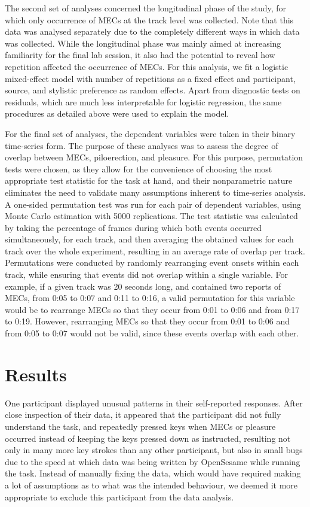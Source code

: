 The second set of analyses concerned the longitudinal phase of the study, for which only occurrence of MECs at the track level was collected. Note that this data was analysed separately due to the completely different ways in which data was collected. While the longitudinal phase was mainly aimed at increasing familiarity for the final lab session, it also had the potential to reveal how repetition affected the occurrence of MECs. For this analysis, we fit a logistic mixed-effect model with number of repetitions as a fixed effect and participant, source, and stylistic preference as random effects. Apart from diagnostic tests on residuals, which are much less interpretable for logistic regression, the same procedures as detailed above were used to explain the model.

For the final set of analyses, the dependent variables were taken in their binary time-series form. The purpose of these analyses was to assess the degree of overlap between MECs, piloerection, and pleasure. For this purpose, permutation tests were chosen, as they allow for the convenience of choosing the most appropriate test statistic for the task at hand, and their nonparametric nature eliminates the need to validate many assumptions inherent to time-series analysis. A one-sided permutation test was run for each pair of dependent variables, using Monte Carlo estimation with 5000 replications. The test statistic was calculated by taking the percentage of frames during which both events occurred simultaneously, for each track, and then averaging the obtained values for each track over the whole experiment, resulting in an average rate of overlap per track. Permutations were conducted by randomly rearranging event onsets within each track, while ensuring that events did not overlap within a single variable. For example, if a given track was 20 seconds long, and contained two reports of MECs, from 0:05 to 0:07 and 0:11 to 0:16, a valid permutation for this variable would be to rearrange MECs so that they occur from 0:01 to 0:06 and from 0:17 to 0:19. However, rearranging MECs so that they occur from 0:01 to 0:06 and from 0:05 to 0:07 would not be valid, since these events overlap with each other.

\section{Results}

One participant displayed unusual patterns in their self-reported responses. After close inspection of their data, it appeared that the participant did not fully understand the task, and repeatedly pressed keys when MECs or pleasure occurred instead of keeping the keys pressed down as instructed, resulting not only in many more key strokes than any other participant, but also in small bugs due to the speed at which data was being written by OpenSesame while running the task. Instead of manually fixing the data, which would have required making a lot of assumptions as to what was the intended behaviour, we deemed it more appropriate to exclude this participant from the data analysis.

